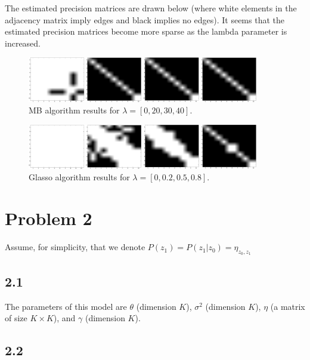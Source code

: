 \documentclass[12pt]{article}
\begin{document}
The estimated precision matrices are drawn below (where white elements in the adjacency matrix imply edges and black implies no edges). It seems that the estimated precision matrices become more sparse as the lambda parameter is increased.
\begin{figure}[h!]
    \centering
    \includegraphics[width=0.9\textwidth]{precImg/mbPrec.pdf}
    \caption{MB algorithm results for $\lambda = [0,20,30,40]$.}
\end{figure}
\begin{figure}[h!]
    \centering
    \includegraphics[width=0.9\textwidth]{precImg/glPrec.pdf}
    \caption{Glasso algorithm results for $\lambda = [0,0.2,0.5,0.8]$.}
\end{figure}



\section*{Problem 2}
\label{sec:prob2}
Assume, for simplicity, that we denote $P(z_1) = P(z_1 | z_0) = \eta_{z_0,z_1}$

\subsection*{2.1}
The parameters of this model are $\theta$ (dimension $K$), $\sigma^2$ (dimension $K$), $\eta$ (a matrix of size $K \times K$), and $\gamma$ (dimension $K$).

\subsection*{2.2}
\end{document}
